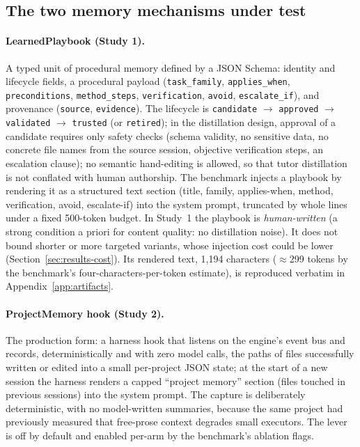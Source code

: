 \documentclass[smallcondensed,natbib]{svjour3}
\begin{document}
\subsection{The two memory mechanisms under
test}\label{sec:method-mechanisms}

\paragraph{LearnedPlaybook (Study 1).}\sloppy A typed unit of
procedural memory defined by a JSON Schema: identity and lifecycle
fields, a procedural payload (\texttt{task\_family}, \texttt{applies\_when},
\texttt{preconditions}, \texttt{method\_steps}, \texttt{verification},
\texttt{avoid}, \texttt{escalate\_if}), and provenance
(\texttt{source}, \texttt{evidence}). The lifecycle is
\texttt{candidate} $\to$ \texttt{approved} $\to$ \texttt{validated}
$\to$ \texttt{trusted} (or \texttt{retired}); in the distillation
design, approval of a candidate requires only safety checks (schema
validity, no sensitive data, no concrete file names from the source
session, objective verification steps, an escalation clause); no
semantic hand-editing is allowed, so that tutor distillation is not conflated
with human authorship. The benchmark injects a playbook by rendering
it as a structured text section (title, family, applies-when, method,
verification, avoid, escalate-if) into the system prompt, truncated by
whole lines under a fixed 500-token budget. In Study~1 the playbook is
\emph{human-written} (a strong condition a priori for content
quality: no distillation noise). It does not bound shorter or more
targeted variants, whose injection cost could be lower
(Section~\ref{sec:results-cost}). Its rendered text, 1{,}194
characters ($\approx$299 tokens by the benchmark's
four-characters-per-token estimate), is reproduced verbatim in
Appendix~\ref{app:artifacts}.

\paragraph{ProjectMemory hook (Study 2).} The production form:
a harness hook that listens on the engine's event bus and records,
deterministically and with zero model calls, the paths of files
successfully written or edited into a small per-project JSON state; at
the start of a new session the harness renders a capped ``project
memory'' section (files touched in previous sessions) into the system
prompt. The capture is deliberately deterministic, with no model-written
summaries, because the same project had previously measured that
free-prose context degrades small executors. The lever is off by
default and enabled per-arm by the benchmark's ablation flags.
\end{document}

